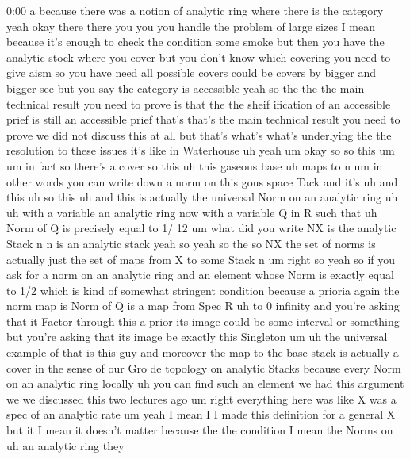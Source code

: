 \begin{unfinished}{0:00}
a
because  there  was  a  notion  of  analytic
ring  where  there  is  the  category  yeah
okay  there  there  you  you  you  handle  the
problem  of  large  sizes  I  mean  because
it's  enough  to  check  the  condition  some
smoke  but  then  you  have  the  analytic
stock  where  you  cover  but  you  don't  know
which  covering  you  need  to  give  aism  so
you  have  need  all  possible  covers  could
be  covers  by  bigger  and  bigger  see  but
you  say  the
category  is  accessible  yeah  so  the  the
the  main  technical  result  you  need  to
prove  is  that  the  the  sheif  ification  of
an  accessible  prief  is  still  an
accessible  prief  that's  that's  the  main
technical  result  you  need  to  prove  we
did  not  discuss  this  at  all  but  that's
what's  what's  underlying  the  the
resolution  to  these
issues  it's  like  in  Waterhouse
uh
yeah
um  okay  so  so  this
um  um  in
fact  so  there's  a
cover  so  this  uh  this  gaseous
base
uh  maps  to
n  um  in  other  words  you  can  write  down  a
norm  on  this  gous  space  Tack  and  it's  uh
and  this  uh  so  this  uh  and  this  is
actually  the  universal
Norm  on  an  analytic
ring  uh  uh  with  a  variable  an  analytic
ring
now  with  a  variable  Q
in  R  such  that  uh  Norm  of  Q  is  precisely
equal  to  1/  12
um  what  did  you  write  NX  is  the  analytic
Stack  n  n  is  an  analytic  stack  yeah  so
yeah  so  the  so  NX  the  set  of  norms  is
actually  just  the  set  of  maps  from  X  to
some  Stack  n
um  right
so  yeah  so  if  you  ask  for  a  norm  on  an
analytic  ring  and  an  element  whose  Norm
is  exactly  equal  to  1/2  which  is  kind  of
somewhat  stringent  condition  because  a
prioria  again  the  norm  map  is  Norm  of  Q
is  a  map  from  Spec  R  uh  to  0  infinity
and  you're  asking  that  it  Factor  through
this  a  prior  its  image  could  be  some
interval  or  something  but  you're  asking
that  its  image  be  exactly  this
Singleton
um  uh  the  universal  example  of  that  is
this  guy  and  moreover  the  map  to  the
base  stack  is  actually  a  cover  in  the
sense  of  our  Gro  de  topology  on  analytic
Stacks  because  every  Norm  on  an  analytic
ring  locally  uh  you  can  find  such  an
element  we  had  this  argument  we  we
discussed  this  two  lectures
ago  um  right  everything  here  was  like  X
was  a  spec  of  an  analytic  rate  um  yeah  I
mean  I  I  made  this  definition  for  a
general  X  but  it  I  mean  it  doesn't
matter  because  the  the  condition  I  mean
the  Norms  on  uh  an  analytic  ring  they

\end{unfinished}
